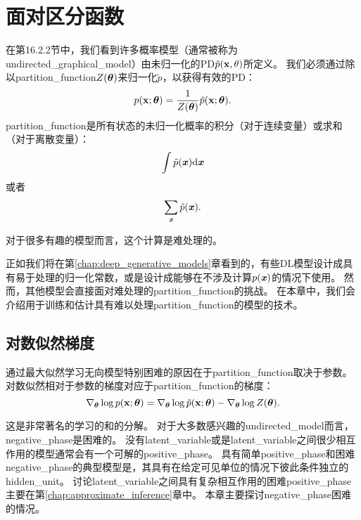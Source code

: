 \chapter{面对区分函数}
\label{chap:confronting_the_partition_function}
在第16.2.2节中，我们看到许多概率模型（通常被称为\gls{undirected_graphical_model}）由未归一化的\gls{PD}$\tilde{p}(\mathbf{x}, \theta)$所定义。
我们必须通过除以\gls{partition_function}$Z(\boldsymbol{\theta})$来归一化$\tilde{p}$，以获得有效的\gls{PD}：
\begin{equation}
	p(\mathbf{x}; \boldsymbol{\theta}) = \frac{1}{Z(\boldsymbol{\theta})} \tilde{p}(\mathbf{x}; \boldsymbol{\theta}).
\end{equation}
\gls{partition_function}是所有状态的未归一化概率的积分（对于连续变量）或求和（对于离散变量）：
\begin{equation}
	\int \tilde{p}(\boldsymbol{\mathit{x}}) \mathrm{d} \boldsymbol{\mathit{x}}
\end{equation}
或者
\begin{equation}
	\sum_{\boldsymbol{\mathit{x}}} \tilde{p} (\boldsymbol{\mathit{x}}).
\end{equation}


对于很多有趣的模型而言，这个计算是难处理的。


正如我们将在第\ref{chap:deep_generative_models}章看到的，有些\gls{DL}模型设计成具有易于处理的归一化常数，或是设计成能够在不涉及计算$p(\boldsymbol{\mathit{x}})$的情况下使用。
然而，其他模型会直接面对难处理的\gls{partition_function}的挑战。
在本章中，我们会介绍用于训练和估计具有难以处理\gls{partition_function}的模型的技术。


\section{对数似然梯度}
\label{sec:the_log_likelihood_gradient}
通过最大似然学习无向模型特别困难的原因在于\gls{partition_function}取决于参数。
对数似然相对于参数的梯度对应于\gls{partition_function}的梯度：
\begin{equation}
	\nabla_{\boldsymbol{\theta}} \log p(\mathbf{x}; \boldsymbol{\theta}) = \nabla_{\boldsymbol{\theta}} \log \tilde{p}(\mathbf{x}; \boldsymbol{\theta}) -
\nabla_{\boldsymbol{\theta}} \log Z(\boldsymbol{\theta}).
\end{equation}


这是非常著名的学习的和的分解。
对于大多数感兴趣的\gls{undirected_model}而言，\gls{negative_phase}是困难的。
没有\gls{latent_variable}或是\gls{latent_variable}之间很少相互作用的模型通常会有一个可解的\gls{positive_phase}。
具有简单\gls{positive_phase}和困难\gls{negative_phase}的典型模型是，其具有在给定可见单位的情况下彼此条件独立的\gls{hidden_unit}。
讨论\gls{latent_variable}之间具有复杂相互作用的困难\gls{positive_phase}主要在第\ref{chap:approximate_inference}章中。
本章主要探讨\gls{negative_phase}困难的情况。


